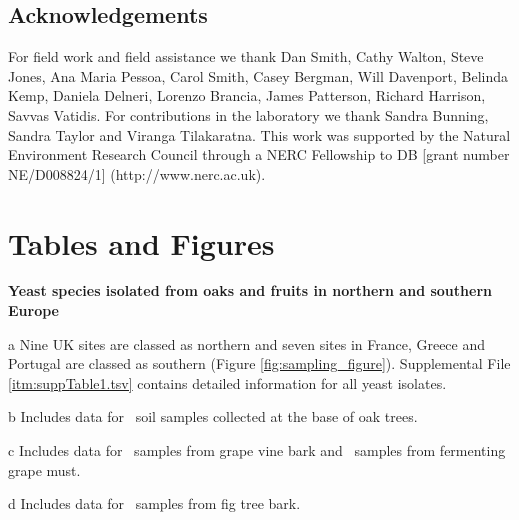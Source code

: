 \documentclass[12pt]{article}
\begin{document}
\begin{linenumbers}

\section*{Acknowledgements}
\label{Acknowledgements}

For field work and field assistance we thank Dan Smith, Cathy Walton, Steve Jones, Ana Maria Pessoa, Carol Smith, Casey Bergman, Will Davenport, Belinda Kemp, Daniela Delneri, Lorenzo Brancia, James Patterson, Richard Harrison, Savvas Vatidis. For contributions in the laboratory we thank Sandra Bunning, Sandra Taylor and Viranga Tilakaratna. This work was supported by the Natural Environment Research Council through a NERC Fellowship to DB [grant number NE/D008824/1] (http://www.nerc.ac.uk). 

\clearpage



{\footnotesize \linespread{1}
}
\end{linenumbers}
\clearpage







\section*{Tables and Figures}


\begingroup
\renewcommand*{\thefootnote}{\alph{footnote}}
\begin{table}[h!] \centering 
 \begin{threeparttable}
\caption{{\bf Yeast species isolated from oaks and fruits in northern and southern Europe}} 
\label{tab:allsp_table}

   \begin{tablenotes}
      \small
      \item [a] Nine UK sites are classed as northern and seven sites in France, Greece and Portugal are classed as southern (Figure \ref{fig:sampling_figure}). Supplemental File \ref{itm:suppTable1.tsv} contains detailed information for all yeast isolates. 
      \item [b] Includes data for \soil\ soil samples collected at the base of oak trees. 
      \item [c] Includes data for \grapebark\ samples from grape vine bark and \must\ samples from fermenting grape must. 
      \item [d] Includes data for \figbark\ samples from fig tree bark. 
    \end{tablenotes}
 \end{threeparttable}
\end{table}
\endgroup
\clearpage
\end{document}
